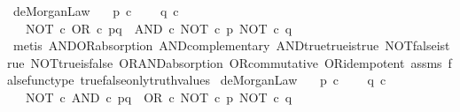 \begin{isabellebody}
\endisatagproof
{\isafoldproof}%
%
\isadelimproof
\isanewline
%
\endisadelimproof
\isanewline
{}\isamarkupfalse%
\ deMorgan{\isacharunderscore}{\kern0pt}Law{}{\isacharcolon}{\kern0pt}\isanewline
\ \ \ {\isachardoublequoteopen}p\ {\isasymin}\isactrlsub c\ {\isasymOmega}{\isachardoublequoteclose}\isanewline
\ \ \ {\isachardoublequoteopen}q\ {\isasymin}\isactrlsub c\ {\isasymOmega}{\isachardoublequoteclose}\isanewline
\ \ \ {\isachardoublequoteopen}NOT\ {\isasymcirc}\isactrlsub c\ OR\ {\isasymcirc}\isactrlsub c\ {\isasymlangle}p{\isacharcomma}{\kern0pt}q{\isasymrangle}\ {\isacharequal}{\kern0pt}\ AND\ {\isasymcirc}\isactrlsub c\ {\isasymlangle}NOT\ {\isasymcirc}\isactrlsub c\ p{\isacharcomma}{\kern0pt}\ NOT\ {\isasymcirc}\isactrlsub c\ q{\isasymrangle}{\isachardoublequoteclose}\isanewline
%
\isadelimproof
\ \ %
\endisadelimproof
%
\isatagproof
{}\isamarkupfalse%
\ {\isacharparenleft}{\kern0pt}metis\ AND{\isacharunderscore}{\kern0pt}OR{\isacharunderscore}{\kern0pt}absorption\ AND{\isacharunderscore}{\kern0pt}complementary\ AND{\isacharunderscore}{\kern0pt}true{\isacharunderscore}{\kern0pt}true{\isacharunderscore}{\kern0pt}is{\isacharunderscore}{\kern0pt}true\ NOT{\isacharunderscore}{\kern0pt}false{\isacharunderscore}{\kern0pt}is{\isacharunderscore}{\kern0pt}true\ NOT{\isacharunderscore}{\kern0pt}true{\isacharunderscore}{\kern0pt}is{\isacharunderscore}{\kern0pt}false\ OR{\isacharunderscore}{\kern0pt}AND{\isacharunderscore}{\kern0pt}absorption\ OR{\isacharunderscore}{\kern0pt}commutative\ OR{\isacharunderscore}{\kern0pt}idempotent\ assms\ false{\isacharunderscore}{\kern0pt}func{\isacharunderscore}{\kern0pt}type\ true{\isacharunderscore}{\kern0pt}false{\isacharunderscore}{\kern0pt}only{\isacharunderscore}{\kern0pt}truth{\isacharunderscore}{\kern0pt}values{\isacharparenright}{\kern0pt}%
\endisatagproof
{\isafoldproof}%
%
\isadelimproof
\isanewline
%
\endisadelimproof
\isanewline
{}\isamarkupfalse%
\ deMorgan{\isacharunderscore}{\kern0pt}Law{}{\isacharcolon}{\kern0pt}\isanewline
\ \ \ {\isachardoublequoteopen}p\ {\isasymin}\isactrlsub c\ {\isasymOmega}{\isachardoublequoteclose}\isanewline
\ \ \ {\isachardoublequoteopen}q\ {\isasymin}\isactrlsub c\ {\isasymOmega}{\isachardoublequoteclose}\isanewline
\ \ \ {\isachardoublequoteopen}NOT\ {\isasymcirc}\isactrlsub c\ AND\ {\isasymcirc}\isactrlsub c\ {\isasymlangle}p{\isacharcomma}{\kern0pt}q{\isasymrangle}\ {\isacharequal}{\kern0pt}\ OR\ {\isasymcirc}\isactrlsub c\ {\isasymlangle}NOT\ {\isasymcirc}\isactrlsub c\ p{\isacharcomma}{\kern0pt}\ NOT\ {\isasymcirc}\isactrlsub c\ q{\isasymrangle}{\isachardoublequoteclose}\isanewline

\end{isabellebody}
